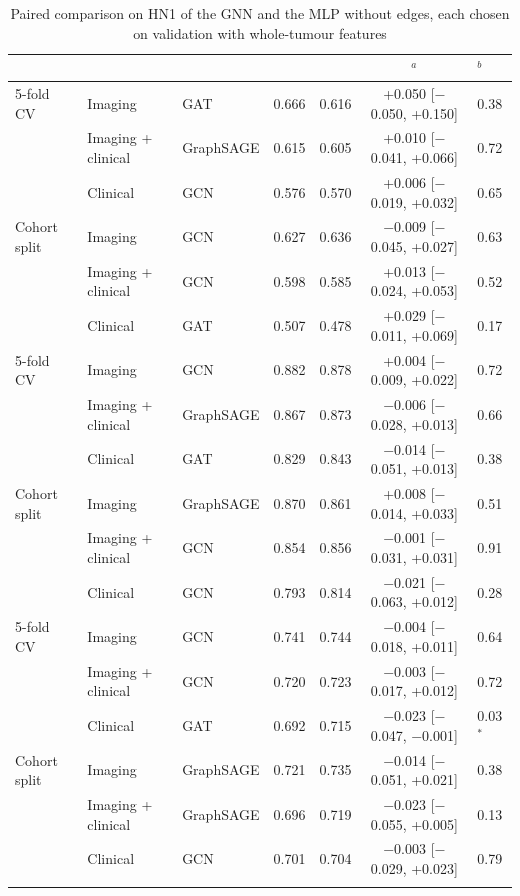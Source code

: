 \begin{table}[!tp]
\centering
\caption{Paired comparison on HN1 of the GNN and the MLP without edges, each chosen on validation with whole-tumour features}\label{tab:paired}
\tabsetup
\begin{tabularx}{\textwidth}{Q{2.0cm} Q{2.8cm} Q{2.0cm} P{1.6cm} P{1.6cm} C P{1.2cm}}
\toprule
{} &  &  &  &  & $^{a}$ & $^{b}$ \\
\midrule
{}
5-fold CV & Imaging & GAT & 0.666 & 0.616 & +0.050 [$-$0.050, +0.150] & 0.38 \\
 & Imaging + clinical & GraphSAGE & 0.615 & 0.605 & +0.010 [$-$0.041, +0.066] & 0.72 \\
 & Clinical & GCN & 0.576 & 0.570 & +0.006 [$-$0.019, +0.032] & 0.65 \\
Cohort split & Imaging & GCN & 0.627 & 0.636 & $-$0.009 [$-$0.045, +0.027] & 0.63 \\
 & Imaging + clinical & GCN & 0.598 & 0.585 & +0.013 [$-$0.024, +0.053] & 0.52 \\
 & Clinical & GAT & 0.507 & 0.478 & +0.029 [$-$0.011, +0.069] & 0.17 \\
5-fold CV & Imaging & GCN & 0.882 & 0.878 & +0.004 [$-$0.009, +0.022] & 0.72 \\
 & Imaging + clinical & GraphSAGE & 0.867 & 0.873 & $-$0.006 [$-$0.028, +0.013] & 0.66 \\
 & Clinical & GAT & 0.829 & 0.843 & $-$0.014 [$-$0.051, +0.013] & 0.38 \\
Cohort split & Imaging & GraphSAGE & 0.870 & 0.861 & +0.008 [$-$0.014, +0.033] & 0.51 \\
 & Imaging + clinical & GCN & 0.854 & 0.856 & $-$0.001 [$-$0.031, +0.031] & 0.91 \\
 & Clinical & GCN & 0.793 & 0.814 & $-$0.021 [$-$0.063, +0.012] & 0.28 \\
5-fold CV & Imaging & GCN & 0.741 & 0.744 & $-$0.004 [$-$0.018, +0.011] & 0.64 \\
 & Imaging + clinical & GCN & 0.720 & 0.723 & $-$0.003 [$-$0.017, +0.012] & 0.72 \\
 & Clinical & GAT & 0.692 & 0.715 & $-$0.023 [$-$0.047, $-$0.001] & 0.03$^{*}$ \\
Cohort split & Imaging & GraphSAGE & 0.721 & 0.735 & $-$0.014 [$-$0.051, +0.021] & 0.38 \\
 & Imaging + clinical & GraphSAGE & 0.696 & 0.719 & $-$0.023 [$-$0.055, +0.005] & 0.13 \\
 & Clinical & GCN & 0.701 & 0.704 & $-$0.003 [$-$0.029, +0.023] & 0.79 \\
\botrule
\end{tabularx}
\end{table}
